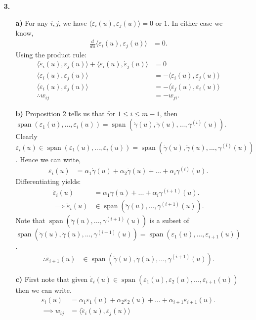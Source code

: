 \documentclass[a4paper]{article}
\newcommand{\ip}[2]{\langle #1, #2 \rangle}
\newcommand{\e}[1]{\varepsilon_{#1}(u)}
\newcommand{\dote}[1]{\dot{\varepsilon}_{#1}(u)}
\newcommand{\ds}{\displaystyle}
\DeclareMathOperator{\spn}{span}
\begin{document}
\begin{enumerate}[leftmargin=*]
\item[\textbf{3.}]
\begin{enumerate}[leftmargin=*]
\item[\textbf{a)}]
	For any $\ds{i, j}$, we have $\ds{\ip{\varepsilon_i(u)}{\varepsilon_j(u)} = 0}$ or $\ds{1}$. In either case we know,
	\begin{align*}
		\frac{d}{du}\ip{\varepsilon_i(u)}{\varepsilon_j(u)} & = 0.
	\end{align*}
	Using the product rule:
	\begin{align*}
		\ip{\dote{i}}{\e{j}} + \ip{\e{i}}{\dote{j}} & = 0 \\
		\ip{\dote{i}}{\e{j}} & = - \ip{\e{i}}{\dote{j}} \\
		\ip{\dote{i}}{\e{j}} & = - \ip{\dote{j}}{\e{i}} \\
		\therefore w_{ij} & = - w_{ji}.
	\end{align*}
\item[\textbf{b)}]
	Proposition 2 tells us that for $\ds{1 \leq i \leq m - 1}$, then $\ds{\spn(\e{1}, ... , \e{i}) = \spn(\dot{\gamma}(u), \ddot{\gamma}(u), ... , \gamma^{(i)}(u))}$. Clearly $\ds{\e{i} \in \spn(\e{1}, ... , \e{i}) = \spn(\dot{\gamma}(u), \ddot{\gamma}(u), ... , \gamma^{(i)}(u))}$. Hence we can write,
	\begin{align*}
		\e{i} & = \alpha_1 \dot{\gamma}(u) + \alpha_2 \ddot{\gamma}(u) + ... + \alpha_i \gamma^{(i)}(u).
	\end{align*}
	Differentiating yields:
	\begin{align*}
		\dote{i} & = \alpha_1 \ddot{\gamma}(u) + ... + \alpha_i \gamma^{(i + 1)}(u). \\
		\implies \dote{i} & \in \spn(\ddot{\gamma}(u), ... ,\gamma^{(i + 1)}(u)).
	\end{align*}
	Note that $\ds{\spn(\ddot{\gamma}(u), ... ,\gamma^{(i + 1)}(u))}$ is a subset of $\ds{\spn(\dot{\gamma}(u), \ddot{\gamma}(u), ..., \gamma^{(i + 1)}(u)) = \spn(\e{1}, ... , \e{i + 1})}$.
	\begin{align*}
		\therefore \dote{i+1} & \in \spn(\dot{\gamma}(u), \ddot{\gamma}(u), ..., \gamma^{(i + 1)}(u)).
	\end{align*}
	\item[\textbf{c)}]
		First note that given $\ds{\dote{i} \in \spn(\e{1}, \e{2}, ... , \e{i + 1})}$ then we can write.
	\begin{align*}
		\dote{i} & = \alpha_1 \e{1} + \alpha_2 \e{2} + ... + \alpha_{i + 1} \e{i + 1}. \\
		\implies w_{ij} & = \ip{\dote{i}}{\e{j}} \\

\end{align*}
\end{enumerate}
\end{enumerate}
\end{document}
